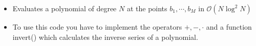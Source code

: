 \begin{itemize}
  \item Evaluates a polynomial of degree $N$ at the points $b_1, \cdots, b_M$ in $\mathcal{O}(N\log^2N)$
  \item To use this code you have to implement the operators $+,-,\cdot$ and a function invert() which calculates the inverse series of a polynomial.
\end{itemize}